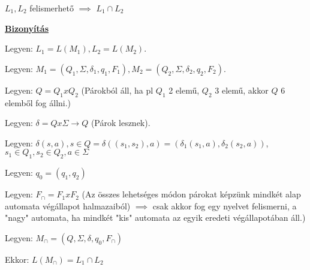 \documentclass[10pt]{article}
\renewcommand{\\}{\par\noindent}
\begin{document}
\begin{frame}
\begin{tcolorbox}[title={Tétel: Felismerhető nyelvek metszete}]
$L_1, L_2$ felismerhető $\implies$ $L_1 \cap L_2$\\
\tcblower
\smallskip
\underline{\textbf{Bizonyítás}}\\
\medskip
\\
Legyen: $L_1 = L(M_1), L_2 = L(M_2)$.\\
Legyen: $M_1 = (Q_1, \Sigma , {\delta}_1, q_1, F_1), M_2 = (Q_2, \Sigma , {\delta}_2, q_2, F_2)$.\\
Legyen: $Q = Q_1 x Q_2$ (Párokból áll, ha pl $Q_1$ 2 elemű, $Q_2$ 3 elemű, akkor $Q$ 6 elemből fog állni.)\\
Legyen: $\delta = Q x \Sigma \rightarrow Q$ (Párok lesznek).\\
Legyen: $\delta(s, a), s \in Q = \delta((s_1, s_2), a) = ({\delta}_1(s_1, a), {\delta}_2(s_2, a))$, $s_1 \in Q_1, s_2 \in Q_2, a \in \Sigma$\\
\bigskip
Legyen: $q_0 = (q_1, q_2)$\\
Legyen: \underline{\textbf{$F_{\cap} = F_1 x F_2$}} (Az összes lehetséges módon párokat képzünk mindkét alap automata végállapot halmazaiból) $\implies$ csak akkor fog egy nyelvet felismerni, a "nagy" automata, ha mindkét "kis" automata az egyik eredeti végállapotában áll.)\\
\smallskip
Legyen: $M_{\cap} = (Q, \Sigma , \delta , q_0, F_{\cap})$\\
\bigskip
Ekkor: \underline{$L(M_{\cap}) = L_1 \cap L_2$}\\
\end{tcolorbox}

\end{frame}
\end{document}
